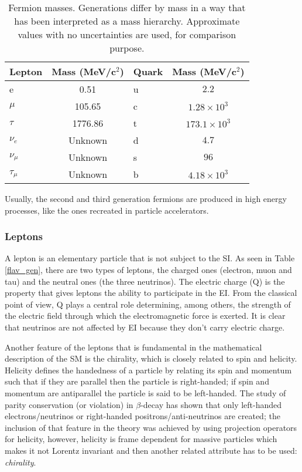 \begin{table}[h]
\centering
\footnotesize
\begin{tabular}{lclc} \hline
Lepton    & Mass (MeV/c$^2$) & Quark  & Mass (MeV/c$^2$)       \\ \hline
e         & 0.51             & u      & $ 2.2$             \\ %
$\mu$     & 105.65           & c      & $ 1.28\times 10^3$ \\ %
$\tau$    & 1776.86          & t      & $ 173.1\times 10^3$\\ %
$\nu_e$   & Unknown          & d      & $ 4.7$             \\ %
$\nu_\mu$ & Unknown          & s      & $ 96$              \\ %
$\tau_\mu$& Unknown          & b      & $ 4.18\times 10^3$ \\ \hline
\end{tabular}
\caption[Fermion masses.]{Fermion masses\cite{pdg}. Generations differ by mass in a way that has been interpreted as a mass hierarchy. Approximate values with no uncertainties are used, for comparison purpose.}\label{f_masses}
\end{table}

Usually, the second and third generation fermions are produced in high energy processes, like the ones recreated in particle accelerators.         

\subsubsection*{Leptons}

A lepton is an elementary particle that is not subject to the SI. As seen in Table \ref{flav_gen}, there are two types of leptons, the charged ones (electron, muon and tau) and the neutral ones (the three neutrinos). The electric charge (Q) is the property that gives leptons the ability to participate in the EI. From the classical point of view, Q plays a central role determining, among others, the strength of the electric field through which the electromagnetic force is exerted. It is clear that neutrinos are not affected by EI because they don't carry electric charge.

Another feature of the leptons that is fundamental in the mathematical description of the SM is the chirality, which is closely related to spin and helicity. Helicity defines the handedness of a particle by relating its spin and momentum such that if they are parallel then the particle is right-handed; if spin and momentum are antiparallel the particle is said to be left-handed. The study of parity conservation (or violation) in $\beta$-decay has shown that only left-handed electrons/neutrinos or right-handed positrons/anti-neutrinos are created\cite{goldhaber}; the inclusion of that feature in the theory was achieved by using projection operators for helicity, however, helicity is frame dependent for massive particles which makes it not Lorentz invariant and then another related attribute has to be used: \textit{chirality}.

